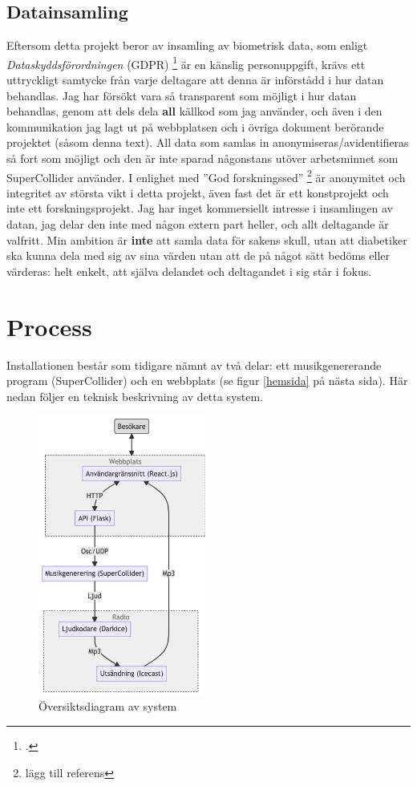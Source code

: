 \documentclass[11pt, a4paper]{article} %
\begin{document}
\subsection*{Datainsamling}
Eftersom detta projekt beror av insamling av biometrisk data, som enligt \emph{Dataskyddsförordningen} (GDPR) \footcite{integritetsskyddsmyndigheten_kansliga_nodate} är en känslig personuppgift, krävs ett uttryckligt samtycke från varje deltagare att denna är införstådd i hur datan behandlas. Jag har försökt vara så transparent som möjligt i hur datan behandlas, genom att dels dela \textbf{all} källkod som jag använder, och även i den kommunikation jag lagt ut på webbplatsen och i övriga dokument berörande projektet (såsom denna text). All data som samlas in anonymiseras/avidentifieras så fort som möjligt och den är inte sparad någonstans utöver arbetsminnet som SuperCollider använder. I enlighet med ''God forskningssed'' \footnote{lägg till referens} är anonymitet och integritet av största vikt i detta projekt, även fast det är ett konstprojekt och inte ett forskningsprojekt. Jag har inget kommersiellt intresse i insamlingen av datan, jag delar den inte med någon extern part heller, och allt deltagande är valfritt. Min ambition är \textbf{inte} att samla data för sakens skull, utan att diabetiker ska kunna dela med sig av sina värden utan att de på något sätt bedöms eller värderas: helt enkelt, att själva delandet och deltagandet i sig står i fokus. 

\section*{Process}
Installationen består som tidigare nämnt av två delar: ett musikgenererande program (SuperCollider) och en webbplats (se figur \ref{hemsida} på nästa sida). Här nedan följer en teknisk beskrivning av detta system.

\begin{figure}[H]
\centering
\includegraphics[width=0.5\textwidth]{../media/flowchart2.png}
\caption{Översiktsdiagram av system}
\end{figure}
\end{document}
